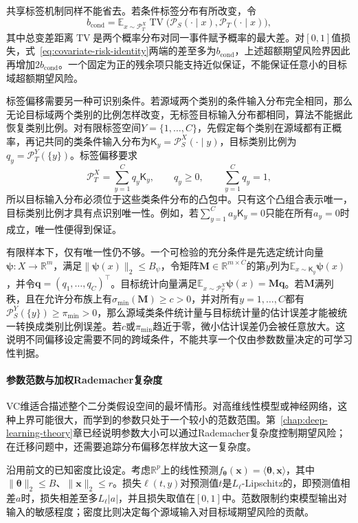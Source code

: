 共享标签机制同样不能省去。若条件标签分布有所改变，令
\[
 b_{\mathrm{cond}}=\mathbb E_{x\sim\mathcal P_T^X}
 \operatorname{TV}\bigl(\mathcal P_S(\cdot\mid x),
                        \mathcal P_T(\cdot\mid x)\bigr),
\]
其中总变差距离$\operatorname{TV}$是两个概率分布对同一事件赋予概率的最大差。对$[0,1]$值损失，式~\eqref{eq:covariate-risk-identity}两端的差至多为$b_{\mathrm{cond}}$，上述超额期望风险界因此再增加$2b_{\mathrm{cond}}$。一个固定为正的残余项只能支持近似保证，不能保证任意小的目标域超额期望风险。

标签偏移需要另一种可识别条件。若源域两个类别的条件输入分布完全相同，那么无论目标域两个类别的比例怎样改变，无标签目标输入分布都相同，算法不能据此恢复类别比例。对有限标签空间$Y=\{1,\ldots,C\}$，先假定每个类别在源域都有正概率，再记共同的类条件输入分布为$\mathsf K_y=\mathcal P_S^X(\cdot\mid y)$，目标类别比例为$q_y=\mathcal P_T^Y(\{y\})$。标签偏移要求
\[
 \mathcal P_T^X=\sum_{y=1}^{C}q_y\mathsf K_y,\qquad
 q_y\geq0,\qquad \sum_{y=1}^{C}q_y=1,
\]
所以目标输入分布必须位于这些类条件分布的凸包中。只有这个凸组合表示唯一，目标类别比例才具有点识别唯一性。例如，若$\sum_{y=1}^C a_y\mathsf K_y=0$只能在所有$a_y=0$时成立，唯一性便得到保证。

有限样本下，仅有唯一性仍不够。一个可检验的充分条件是先选定统计向量$\bm\psi:X\to\mathbb R^m$，满足$\|\bm\psi(x)\|_2\leq B_\psi$，令矩阵$\bm M\in\mathbb R^{m\times C}$的第$y$列为$\mathbb E_{x\sim\mathsf K_y}\bm\psi(x)$，并令$\bm q=(q_1,\ldots,q_C)^\top$。目标统计向量满足$\mathbb E_{x\sim\mathcal P_T^X}\bm\psi(x)=\bm M\bm q$。若$\bm M$满列秩，且在允许分布族上有$\sigma_{\min}(\bm M)\geq c>0$，并对所有$y=1,\ldots,C$都有$\mathcal P_S^Y(\{y\})\geq\pi_{\min}>0$，那么源域类条件统计量与目标统计量的估计误差才能被统一转换成类别比例误差。若$c$或$\pi_{\min}$趋近于零，微小估计误差仍会被任意放大。这说明不同偏移设定需要不同的跨域条件，不能共享一个仅由参数数量决定的可学习性判据。

\paragraph{参数范数与加权Rademacher复杂度}
\label{sec:transfer-norm-complexity}

VC维适合描述整个二分类假设空间的最坏情形。对高维线性模型或神经网络，这种上界可能很大，而学到的参数只处于一个较小的范数范围。第~\ref{chap:deep-learning-theory}章已经说明参数大小可以通过Rademacher复杂度控制期望风险；在迁移问题中，还需要追踪分布偏移怎样放大这一复杂度。

沿用前文的已知密度比设定。考虑$\mathbb R^p$上的线性预测$f_{\bm\theta}(\bm x)=\langle\bm\theta,\bm x\rangle$，其中$\|\bm\theta\|_2\leq B$、$\|\bm x\|_2\leq r$。损失$\ell(t,y)$对预测值$t$是$L_{\ell}$-Lipschitz的，即预测值相差$a$时，损失相差至多$L_{\ell}|a|$，并且损失取值在$[0,1]$中。范数限制约束模型输出对输入的敏感程度；密度比则决定每个源域输入对目标域期望风险的贡献。

